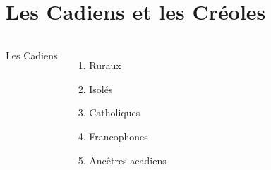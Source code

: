 \documentclass{beamer}
\begin{document}
  \section{Les Cadiens et les Créoles}
    \begin{frame}{}
      \begin{columns}
          \begin{minipage}[0.6\textheight]{\linewidth}
            Les Cadiens
            \begin{enumerate}
              \item Ruraux
              \item Isolés
              \item Catholiques
              \item Francophones
              \item Ancêtres acadiens
            \end{enumerate}
          \end{minipage}
      \end{columns}
    \end{frame}
\end{document}
